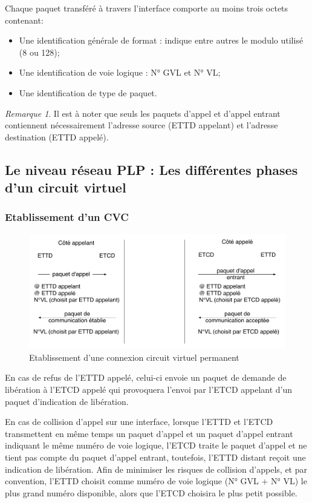 \documentclass[11pt,english,french]{scrreprt}
\theoremstyle{remark}
\newtheorem*{rem*}{Remarque}
\theoremstyle{definition}
\begin{document}
Chaque paquet transféré à travers l'interface comporte au moins trois octets contenant: 
\begin{itemize}
	\item Une identification générale de format : indique entre autres le modulo utilisé (8 ou 128);
	\item Une identification de voie logique : N° GVL et N° VL;
	\item Une identification de type de paquet.
\end{itemize}

\begin{rem*}
	Il est à noter que seuls les paquets d’appel et d’appel entrant contiennent nécessairement l’adresse source (ETTD appelant) et l’adresse destination (ETTD appelé).
\end{rem*}

\subsection{Le niveau réseau PLP : Les différentes phases d'un circuit virtuel}

\subsubsection*{Etablissement d'un CVC} %

\begin{figure}[h!]
	\center
	\includegraphics[scale=.7]{graphes/X25-etablissement}
	\caption{Etablissement d'une connexion circuit virtuel permanent}
\end{figure}


En cas de refus de l'ETTD appelé, celui-ci envoie un paquet de demande de libération à l'ETCD appelé qui provoquera l'envoi par l'ETCD appelant d'un paquet d'indication de libération. 

En cas de collision d'appel sur une interface, lorsque l'ETTD et l'ETCD transmettent en même temps un paquet d'appel et un paquet d'appel entrant indiquant le même numéro de voie logique, l'ETCD traite le paquet d'appel et ne tient pas compte du paquet d'appel entrant, toutefois, l'ETTD distant reçoit une indication de libération.
Afin de minimiser les risques de collision d'appels, et par convention, l'ETTD choisit comme numéro de voie logique (N° GVL + N° VL) le plus grand numéro disponible, alors que l'ETCD choisira le plus petit possible.
\end{document}
